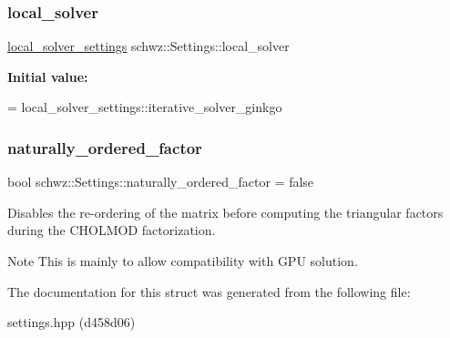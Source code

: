 \subsubsection{\texorpdfstring{local\+\_\+solver}{local\_solver}}
{\footnotesize\ttfamily \hyperlink{structschwz_1_1Settings_a31e82310ef6aed08168baef78f0db69e}{local\+\_\+solver\+\_\+settings} schwz\+::\+Settings\+::local\+\_\+solver}

{\bfseries Initial value\+:}
\begin{DoxyCode}
=
        local\_solver\_settings::iterative\_solver\_ginkgo
\end{DoxyCode}
\mbox{\label{structschwz_1_1Settings_a75a2ff3778c7334382a6c74553dbd5b4}} 
\subsubsection{\texorpdfstring{naturally\+\_\+ordered\+\_\+factor}{naturally\_ordered\_factor}}
{\footnotesize\ttfamily bool schwz\+::\+Settings\+::naturally\+\_\+ordered\+\_\+factor = false}



Disables the re-\/ordering of the matrix before computing the triangular factors during the C\+H\+O\+L\+M\+OD factorization. 

\begin{DoxyNote}{Note}
This is mainly to allow compatibility with G\+PU solution. 
\end{DoxyNote}


The documentation for this struct was generated from the following file\+:\begin{DoxyCompactItemize}
\item 
settings.\+hpp (d458d06)\end{DoxyCompactItemize}
